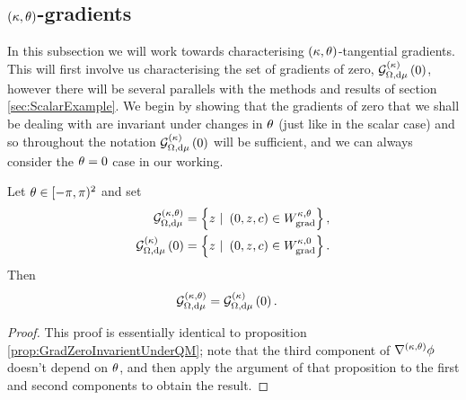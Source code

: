 \subsection{$\left( \kappa, \theta \right)$-gradients} \label{sec:ktGradients}
In this subsection we will work towards characterising $\left( \kappa,\theta \right)$-tangential gradients.
This will first involve us characterising the set of gradients of zero, $\mathcal{G}_{ \Omega, \mathrm{d}\mu}^{(\kappa)}\left( 0 \right)$, however there will be several parallels with the methods and results of section \ref{sec:ScalarExample}. 
We begin by showing that the gradients of zero that we shall be dealing with are invariant under changes in $\theta$ (just like in the scalar case) and so throughout the notation $\mathcal{G}_{ \Omega, \mathrm{d}\mu}^{(\kappa)}\left( 0 \right)$ will be sufficient, and we can always consider the $\theta=0$ case in our working.
\begin{prop} \label{prop:kGradZeroInvarientUnderQM}
	Let $\theta\in[-\pi,\pi)^2$ and set 
	\begin{align*}
		\mathcal{G}^{\kt}_{\ddom, \mathrm{d}\ddmes} &= \clbracs{ z \ \vert \ \bracs{0,z,c}\in W^{\wavenumber, \qm}_{\mathrm{grad}}}, \\
		\kgradZero{\ddom}{\ddmes} &= \clbracs{ z \ \vert \ \bracs{0,z,c}\in W^{\wavenumber, 0}_{\mathrm{grad}}}.
	\end{align*}
	Then
	\begin{align*}
		\mathcal{G}^{\left( \kappa, \theta \right)}_{\Omega, \mathrm{d}\mu} &= \mathcal{G}_{ \Omega, \mathrm{d}\mu}^{(\kappa)}\left( 0 \right).
	\end{align*}
\end{prop}
\begin{proof}
	This proof is essentially identical to proposition \ref{prop:GradZeroInvarientUnderQM}; note that the third component of $\nabla^{\left( \kappa, \theta \right)}\phi$ doesn't depend on $\theta$, and then apply the argument of that proposition to the first and second components to obtain the result.
\end{proof}

